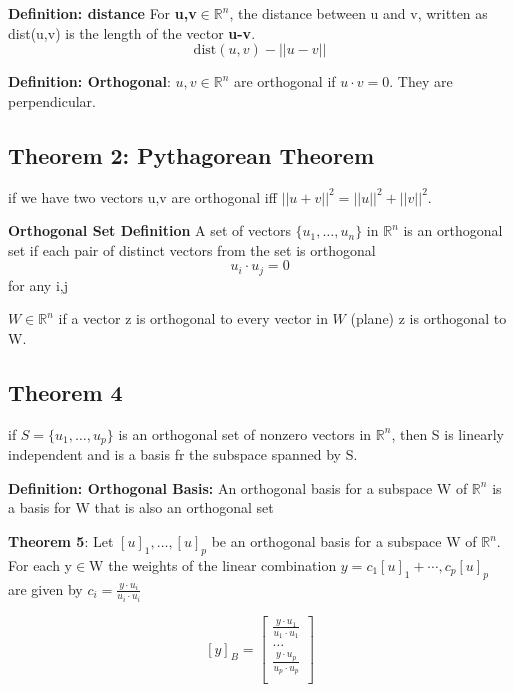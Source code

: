\hfill
\hfill


\textbf{Definition: distance}
For \textbf{u,v}$\in\mathbb{R}^{n}$, the distance between u and v, written as dist(u,v) is the length of the vector \textbf{u-v}. 
\begin{equation}
	\label{}
	\mbox{dist}(u,v)-||u-v||	
\end{equation}

\textbf{Definition: Orthogonal}: $u,v\in\mathbb{R}^{n}$ are orthogonal if $u\cdot v = 0$. They are perpendicular.

\subsection{Theorem 2: Pythagorean Theorem}
if we have two vectors u,v are orthogonal iff $||u+v||^{2}=||u||^{2}+||v||^{2}$. 

\textbf{Orthogonal Set Definition}
A set of vectors $\{u_{1},\ldots,u_{n}\}$ in $\mathbb{R}^{n}$ is an orthogonal set if each pair of distinct vectors from the set is orthogonal
\begin{equation}
	\label{}
	u_{i}\cdot u_{j} = 0
\end{equation}
for any i,j

$W\in\mathbb{R}^{n}$ if a vector z is orthogonal to every vector in $W$ (plane) z is orthogonal to W.



\subsection{Theorem 4}
if $S=\{u_{1},\ldots,u_{p}\}$ is an orthogonal set of nonzero vectors in $\mathbb{R}^{n}$, then S is linearly independent and is a basis fr the subspace spanned by S.


\hfill
\hfill


\textbf{Definition: Orthogonal Basis:}
An orthogonal basis for a subspace W of $\mathbb{R}^{n}$ is a basis for W that is also an orthogonal set


\textbf{Theorem 5}: Let $[u]_{1},\ldots,[u]_{p}$ be an orthogonal basis for a subspace W of $\mathbb{R}^{n}$. For each y$\in$W the weights of the linear combination $y=c_1[u]_1+\cdots,c_p[u]_p$ are given by $c_{i}=\frac{y\cdot u_{i}}{u_{i}\cdot u_{i}}$


\begin{equation}
	\label{}
	[y]_{B}=
	\begin{bmatrix}
		\frac{y\cdot u_{1}}{u_{1}\cdot u_{1}}\\\ldots\\\frac{y\cdot u_{p}}{u_{p}\cdot u_{p}}\\
	\end{bmatrix}
\end{equation}

